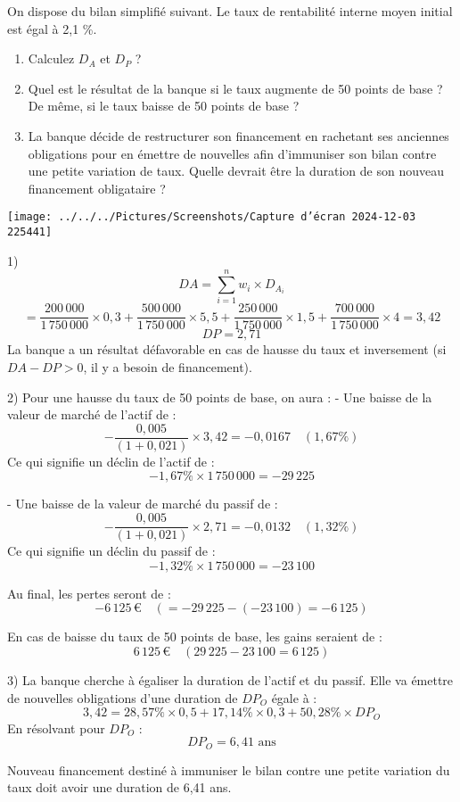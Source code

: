 \documentclass[a4paper, 12pt]{report}
\begin{document}
On dispose du bilan simplifié suivant. Le taux de rentabilité interne moyen initial est égal à 2,1 \%.

\begin{enumerate}
	\item Calculez \(D_A\) et \(D_P\) ?
	\item Quel est le résultat de la banque si le taux augmente de 50 points de base ? De même, si le taux baisse de 50 points de base ?
	\item La banque décide de restructurer son financement en rachetant ses anciennes obligations pour en émettre de nouvelles afin d’immuniser son bilan contre une petite variation de taux. Quelle devrait être la duration de son nouveau financement obligataire ?
\end{enumerate}

\texttt{[image: ../../../Pictures/Screenshots/Capture d'écran 2024-12-03 225441]}

1) 
\[
DA = \sum_{i=1}^{n} w_i \times D_{A_i} 
\]
\[ = \frac{200\,000}{1\,750\,000} \times 0,3 + \frac{500\,000}{1\,750\,000} \times 5,5 + \frac{250\,000}{1\,750\,000} \times 1,5 + \frac{700\,000}{1\,750\,000} \times 4 = 3,42 \]
\[
DP = 2,71
\]
La banque a un résultat défavorable en cas de hausse du taux et inversement (si \(DA - DP > 0\), il y a besoin de financement).

2) Pour une hausse du taux de 50 points de base, on aura :
- Une baisse de la valeur de marché de l’actif de :
\[
-\frac{0,005}{(1+0,021)} \times 3,42 = -0,0167 \quad (1,67\%)
\]
Ce qui signifie un déclin de l'actif de :
\[
-1,67\% \times 1\,750\,000 = -29\,225
\]

- Une baisse de la valeur de marché du passif de :
\[
-\frac{0,005}{(1+0,021)} \times 2,71 = -0,0132 \quad (1,32\%)
\]
Ce qui signifie un déclin du passif de :
\[
-1,32\% \times 1\,750\,000 = -23\,100
\]

Au final, les pertes seront de :
\[
-6\,125 \,€ \quad (= -29\,225 - (-23\,100) = -6\,125)
\]

En cas de baisse du taux de 50 points de base, les gains seraient de :
\[
6\,125 \,€ \quad (29\,225 - 23\,100 = 6\,125)
\]

3) 
La banque cherche à égaliser la duration de l’actif et du passif. Elle va émettre de nouvelles obligations d’une duration de \(DP_{O}\) égale à :
\[
3,42 = 28,57\% \times 0,5 + 17,14\% \times 0,3 + 50,28\% \times DP_{O}
\]
En résolvant pour \(DP_{O}\) :
\[
DP_{O} = 6,41 \text{ ans}
\]

Nouveau financement destiné à immuniser le bilan contre une petite variation du taux doit avoir une duration de 6,41 ans.
\end{document}
